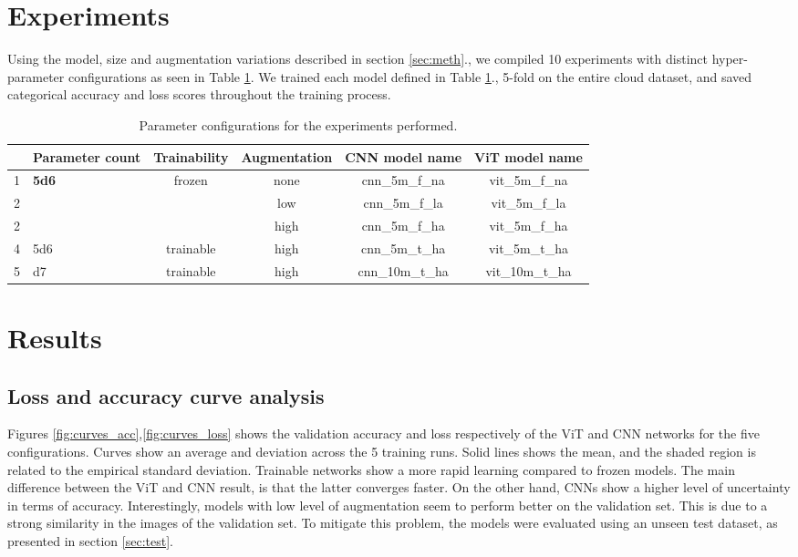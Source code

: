 \documentclass{article}
\begin{document}
\section{Experiments}
Using the model, size and augmentation variations described in section \ref{sec:meth}., we compiled 10 experiments with distinct hyper-parameter configurations as seen in Table \ref{tab:exp}.
We trained each model defined in Table \ref{tab:exp}., 5-fold on the entire cloud dataset, and saved categorical accuracy and loss scores throughout the training process.

\begin{table}[]
\caption{Parameter configurations for the experiments performed. \label{tab:exp}}
\begin{tabular}{|l|l|c|c|c|c|}
\hline
 & \textbf{Parameter count} & \multicolumn{1}{l|}{\textbf{Trainability}} & \multicolumn{1}{l|}{\textbf{Augmentation}} & \textbf{CNN model name}         & \textbf{ViT model name}         \\ \hline \hline
                   1  &  \multirow{2}{*}{\textbf{\num{5d6}}}  & \multirow{2}{*}{frozen} & none                                  & cnn\_5m\_f\_na  & vit\_5m\_f\_na   \\\cline{4-6}
2 &  &   & low                                   & cnn\_5m\_f\_la  & vit\_5m\_f\_la  \\\cline{4-6}
               2 &     &  & high                                  & cnn\_5m\_f\_ha  & vit\_5m\_f\_ha  \\\hline
4 & \num{5d6}          & trainable                                    & high                         & cnn\_5m\_t\_ha  & vit\_5m\_t\_ha  \\ \hline
5 & \num{d7}          & trainable                                   & high                         & cnn\_10m\_t\_ha & vit\_10m\_t\_ha \\ \hline
\end{tabular}
\end{table}

\section{Results}
\subsection{Loss and accuracy curve analysis}
Figures \ref{fig:curves_acc},\ref{fig:curves_loss} shows the validation accuracy and loss respectively of the ViT and CNN networks for the five configurations. Curves show an average and deviation across the 5 training runs. Solid lines shows the mean, and the shaded region is related to the empirical standard deviation.
Trainable networks show a more rapid learning compared to frozen models. The main difference between the ViT and CNN result, is that the latter converges faster. On the other hand, CNNs show a higher level of uncertainty in terms of accuracy.
Interestingly, models with low level of augmentation seem to perform better on the validation set. This is due to a strong similarity in the images of the validation set. To mitigate this problem, the models were evaluated using an unseen test dataset, as presented in section \ref{sec:test}.
\end{document}

